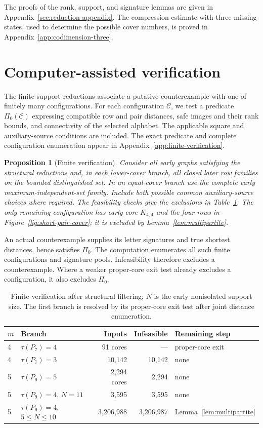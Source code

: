 \documentclass[11pt]{article}
\theoremstyle{definition}
\theoremstyle{plain}
\newtheorem{proposition}[theorem]{Proposition}
\begin{document}
The proofs of the rank, support, and signature lemmas are given in
Appendix~\ref{sec:reduction-appendix}. The compression estimate with
three missing states, used to determine the possible cover numbers,
is proved in Appendix~\ref{app:codimension-three}.
\section{Computer-assisted verification}\label{sec:computation}
The finite-support reductions associate a putative counterexample
with one of finitely many configurations. For each configuration $\mathcal C$,
we test a predicate $\Pi_0(\mathcal C)$ expressing compatible row and
pair distances, safe images and their rank bounds, and connectivity of
the selected alphabet. The applicable square and auxiliary-source
conditions are included. The exact predicate and complete
configuration enumeration appear in
Appendix~\ref{app:finite-verification}.

\begin{proposition}[Finite verification]\label{prop:finite-verification}
Consider all early graphs satisfying the structural reductions and,
in each lower-cover branch, all closed later row families on the
bounded distinguished set. In an equal-cover branch use the complete
early maximum-independent-set family. Include both possible common
auxiliary-source choices where required.
The feasibility checks give the exclusions in Table~\ref{tab:coverage}.
The only remaining configuration has early core $K_{4,4}$ and the four
rows in Figure~\ref{fig:short-pair-cover}; it is excluded by
Lemma~\ref{lem:multipartite}.
\end{proposition}

An actual counterexample supplies its letter signatures and true shortest
distances, hence satisfies $\Pi_0$. The computation enumerates all such
finite configurations and signature pools. Infeasibility therefore
excludes a counterexample. Where a weaker proper-core exit test already
excludes a configuration, it also excludes $\Pi_0$.

\begin{table}[!htbp]
\centering\small
\begin{tabular}{@{}llrrp{.25\linewidth}@{}}
\toprule
$m$ & Branch & Inputs & Infeasible & Remaining step\\
\midrule
4 & $\tau(P_7)=4$ & 91 cores & --- & proper-core exit\\
4 & $\tau(P_7)=3$ & 10,142 & 10,142 & none\\
5 & $\tau(P_9)=5$ & 2,294 cores & 2,294 & none\\
5 & $\tau(P_9)=4$, $N=11$ & 3,595 & 3,595 & none\\
5 & $\tau(P_9)=4$, $5\le N\le10$ & 3,206,988 & 3,206,987 & Lemma~\ref{lem:multipartite}\\
\bottomrule
\end{tabular}
\caption{Finite verification after structural filtering; $N$ is the
early nonisolated support size. The first branch is resolved by its
proper-core exit test after joint distance enumeration.}
\label{tab:coverage}
\end{table}
\end{document}

